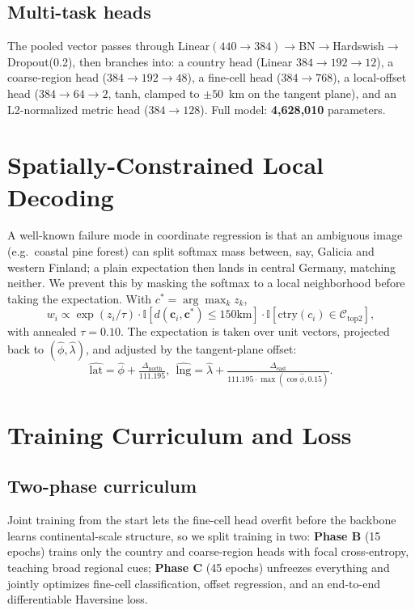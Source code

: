 \documentclass[10pt,twocolumn,a4paper]{article}
\begin{document}
\subsection{Multi-task heads}
The pooled vector passes through Linear$(440{\to}384)\to$BN$\to$Hardswish$\to$Dropout(0.2), then branches into: a country head (Linear $384{\to}192{\to}12$), a coarse-region head ($384{\to}192{\to}48$), a fine-cell head ($384{\to}768$), a local-offset head ($384{\to}64{\to}2$, tanh, clamped to $\pm50$~km on the tangent plane), and an L2-normalized metric head ($384{\to}128$). Full model: \textbf{4{,}628{,}010} parameters.

\section{Spatially-Constrained Local Decoding}
A well-known failure mode in coordinate regression is that an ambiguous image (e.g.\ coastal pine forest) can split softmax mass between, say, Galicia and western Finland; a plain expectation then lands in central Germany, matching neither. We prevent this by masking the softmax to a local neighborhood before taking the expectation. With $c^*=\arg\max_k z_k$,
\begin{equation}
w_i \propto \exp(z_i/\tau)\cdot\mathbb{I}[d(\mathbf{c}_i,\mathbf{c}^*)\le150\text{km}]\cdot\mathbb{I}[\text{ctry}(c_i)\in\mathcal{C}_{\text{top2}}],
\end{equation}
with annealed $\tau=0.10$. The expectation is taken over unit vectors, projected back to $(\hat{\phi},\hat{\lambda})$, and adjusted by the tangent-plane offset:
\begin{equation}
\hat{\text{lat}} = \hat{\phi} + \tfrac{\Delta_{\text{north}}}{111.195},\ \
\hat{\text{lng}} = \hat{\lambda} + \tfrac{\Delta_{\text{east}}}{111.195\cdot\max(\cos\hat{\phi},0.15)}.
\end{equation}

\section{Training Curriculum and Loss}
\subsection{Two-phase curriculum}
Joint training from the start lets the fine-cell head overfit before the backbone learns continental-scale structure, so we split training in two: \textbf{Phase B} (15 epochs) trains only the country and coarse-region heads with focal cross-entropy, teaching broad regional cues; \textbf{Phase C} (45 epochs) unfreezes everything and jointly optimizes fine-cell classification, offset regression, and an end-to-end differentiable Haversine loss.
\end{document}
